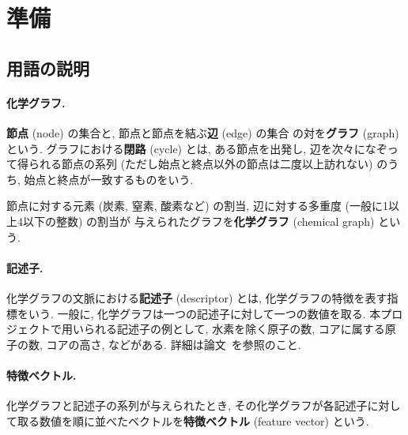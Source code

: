 \documentclass[11pt, titlepage, dvipdfmx, twoside]{jarticle}
\begin{document}
\clearpage
\section{準備}
\label{sec:preparation}

\subsection{用語の説明}
\paragraph{化学グラフ.}
{\bf 節点} (node) の集合と, 節点と節点を結ぶ{\bf 辺} (edge) の集合
の対を{\bf グラフ} (graph) という.
グラフにおける{\bf 閉路} (cycle) とは,
ある節点を出発し, 辺を次々になぞって得られる節点の系列
(ただし始点と終点以外の節点は二度以上訪れない) のうち, 始点と終点が一致するものをいう.

節点に対する元素 (炭素, 窒素, 酸素など) の割当, 
辺に対する多重度 (一般に1以上4以下の整数) の割当が
与えられたグラフを{\bf 化学グラフ} (chemical graph) という. 

\paragraph{記述子.}
化学グラフの文脈における{\bf 記述子} (descriptor) とは, 化学グラフの特徴を表す指標をいう.
一般に, 化学グラフは一つの記述子に対して一つの数値を取る.
本プロジェクトで用いられる記述子の例として,
水素を除く原子の数, コアに属する原子の数, コアの高さ, などがある. 
詳細は論文~\cite{BH_2L-model}を参照のこと. 

\paragraph{特徴ベクトル.}
化学グラフと記述子の系列が与えられたとき,
その化学グラフが各記述子に対して取る数値を順に並べたベクトルを{\bf 特徴ベクトル} (feature vector)
という. 


\end{document}
